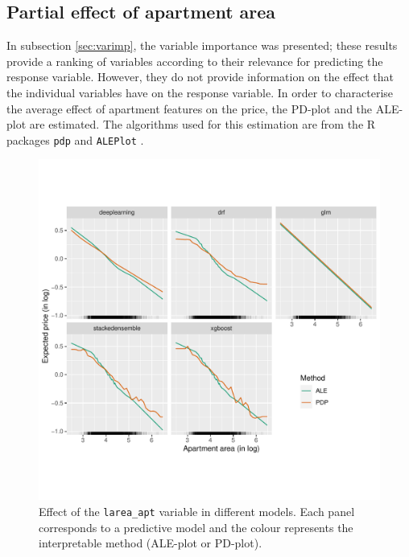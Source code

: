 \documentclass[smallextended,natbib]{svjour3}\usepackage[]{graphicx}\usepackage[]{xcolor}
\begin{document}
\subsection{Partial effect of apartment area} \label{sub:resultados_pdp}
In subsection \ref{sec:varimp}, the variable importance was presented; these results provide a ranking of variables according to their relevance for predicting the response variable.  However, they do not provide information on the effect that the individual variables have on the response variable. In order to characterise the average effect of apartment features on the price, the PD-plot and the ALE-plot  are estimated. The algorithms used for this estimation are from the R packages \texttt{pdp} \citep{pdp} and \texttt{ALEPlot} \citep{aleplot}. 
\begin{figure}[hbpt]
    \centering
    \includegraphics[scale=.9]{figures/fig-efecto-lsub.pdf}
    \caption{Effect of the \texttt{larea\_apt} variable in different models. Each panel corresponds to a predictive model and the colour represents the interpretable method (ALE-plot or PD-plot).}
    \label{fig-pdpalesup}
\end{figure}
\end{document}
